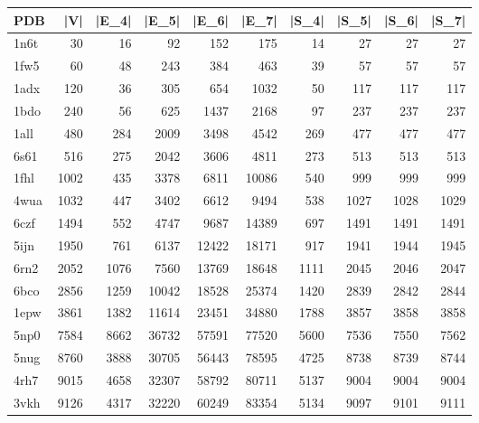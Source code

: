 \begin{tabular}{lrrrrrrrrr}
\toprule
PDB & |V|   & |E_4| & |E_5| & |E_6| & |E_7| & |S_4| & |S_5| & |S_6| & |S_7| \\
\midrule
1n6t & 30   & 16    & 92    & 152 & 175 & 14 & 27 & 27 & 27 \\
1fw5 & 60   & 48    & 243   & 384 & 463 & 39 & 57 & 57 & 57 \\
1adx & 120  & 36    & 305   & 654 & 1032 & 50 & 117 & 117 & 117 \\
1bdo & 240  & 56    & 625   & 1437 & 2168 & 97 & 237 & 237 & 237 \\
1all & 480  & 284   & 2009  & 3498 & 4542 & 269 & 477 & 477 & 477 \\
6s61 & 516  & 275   & 2042  & 3606 & 4811 & 273 & 513 & 513 & 513 \\
1fhl & 1002 & 435   & 3378  & 6811 & 10086 & 540 & 999 & 999 & 999 \\
4wua & 1032 & 447   & 3402  & 6612 & 9494 & 538 & 1027 & 1028 & 1029 \\
6czf & 1494 & 552   & 4747  & 9687 & 14389 & 697 & 1491 & 1491 & 1491 \\
5ijn & 1950 & 761   & 6137  & 12422 & 18171 & 917 & 1941 & 1944 & 1945 \\
6rn2 & 2052 & 1076  & 7560  & 13769 & 18648 & 1111 & 2045 & 2046 & 2047 \\
6bco & 2856 & 1259  & 10042 & 18528 & 25374 & 1420 & 2839 & 2842 & 2844 \\
1epw & 3861 & 1382  & 11614 & 23451 & 34880 & 1788 & 3857 & 3858 & 3858 \\
5np0 & 7584 & 8662  & 36732 & 57591 & 77520 & 5600 & 7536 & 7550 & 7562 \\
5nug & 8760 & 3888  & 30705 & 56443 & 78595 & 4725 & 8738 & 8739 & 8744 \\
4rh7 & 9015 & 4658  & 32307 & 58792 & 80711 & 5137 & 9004 & 9004 & 9004 \\
3vkh & 9126 & 4317  & 32220 & 60249 & 83354 & 5134 & 9097 & 9101 & 9111 \\
\bottomrule
\end{tabular}
